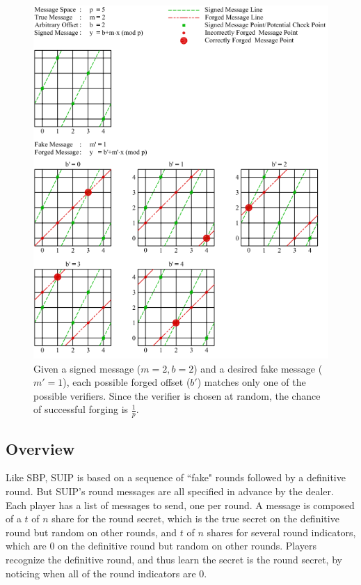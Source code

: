 \documentclass{dalcsthesis}
\begin{document}
\begin{figure}
\includegraphics[width=\textwidth]{../../Graphics/PointAndLineExample.png}
\caption{Given a signed message ($m=2, b=2$) and a desired fake message ($m'=1$), each possible forged offset ($b'$) matches only one of the possible verifiers. Since the verifier is chosen at random, the chance of successful forging is $\frac{1}{p}$.}
\label{img:ForgingVerifiableMessageForUnbounded}
\end{figure}

\subsection{Overview}

Like SBP, SUIP is based on a sequence of ``fake" rounds followed by a definitive round. But SUIP's round messages are all specified in advance by the dealer. Each player has a list of messages to send, one per round. A message is composed of a $t$ of $n$ share for the round secret, which is the true secret on the definitive round but random on other rounds, and $t$ of $n$ shares for several round indicators, which are 0 on the definitive round but random on other rounds. Players recognize the definitive round, and thus learn the secret is the round secret, by noticing when all of the round indicators are 0.
\end{document}
